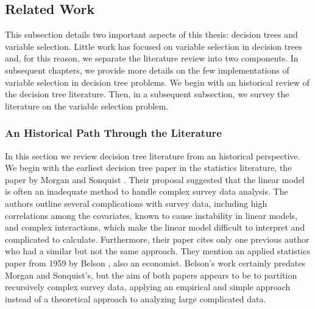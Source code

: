 \subsection{Related Work}
\label{ch:related}


This subsection details two important aspects of this thesis: decision trees and variable selection. Little work has focused on variable selection in decision trees and, for this reason, we separate the literature review into two components. In subsequent chapters, we provide more details on the few implementations of variable selection in decision tree problems. We begin with an historical review of the decision tree literature. Then, in a subsequent subsection, we survey the literature on the variable selection problem. 

\subsubsection{An Historical Path Through the Literature}

In this section we review decision tree literature from an historical perspective. We begin with the earliest decision tree paper in the statistics literature, the paper by Morgan and Sonquist \cite{morgan1963problems}. Their proposal suggested that the linear model is often an inadequate method to handle complex survey data analysis. The authors outline several complications with survey data, including high correlations among the covariates, known to cause instability in linear models, and complex interactions, which make the linear model difficult to interpret and complicated to calculate. Furthermore, their paper cites only one previous author who had a similar but not the same approach. They mention an applied statistics paper from 1959 by Belson \cite{belson1959matching}, also an economist. Belson's work certainly predates Morgan and Sonquist's, but the aim of both papers appears to be to partition recursively complex survey data, applying an empirical and simple approach instead of a theoretical approach to analyzing large complicated data. 

